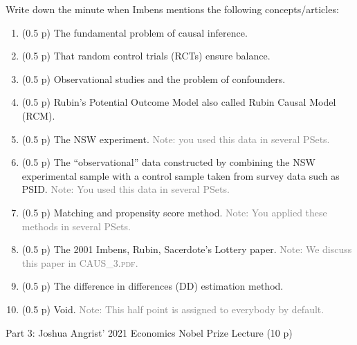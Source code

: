 \documentclass{article}
\begin{document}
Write down the minute when Imbens mentions the following concepts/articles:
\begin{enumerate}[label=\textbf{Q\arabic{enumi}}.,ref=Q\arabic{enumi}, wide=0pt, itemsep=0em, topsep=5pt, labelindent=0pt, resume]


\item (0.5 p) The fundamental problem of causal inference.

\item (0.5 p) That random control trials (RCTs) ensure balance.

\item (0.5 p) Observational studies and the problem of confounders.

\item (0.5 p) Rubin's Potential Outcome Model also called Rubin Causal Model (RCM).

\item (0.5 p) The NSW experiment. \textcolor{gray}{Note: you used this data in several PSets.}

\item (0.5 p) The ``observational'' data constructed by combining the NSW experimental sample with a control sample taken from survey data such as PSID. \textcolor{gray}{Note: You used this data in several PSets.}

\item (0.5 p) Matching and propensity score method. \textcolor{gray}{Note: You applied these methods in several PSets.} 

\item (0.5 p) The 2001 Imbens, Rubin, Sacerdote's Lottery paper. \textcolor{gray}{Note: We discuss this paper in \textsc{CAUS\_3.pdf}.}

\item (0.5 p) The difference in differences (DD) estimation method.

\item (0.5 p) Void. \textcolor{gray}{Note: This half point is assigned to everybody by default.}
\end{enumerate}


\begin{center}
{\LARGE Part 3: Joshua Angrist' 2021 Economics Nobel Prize Lecture (10 p)}
\end{center}
\end{document}
